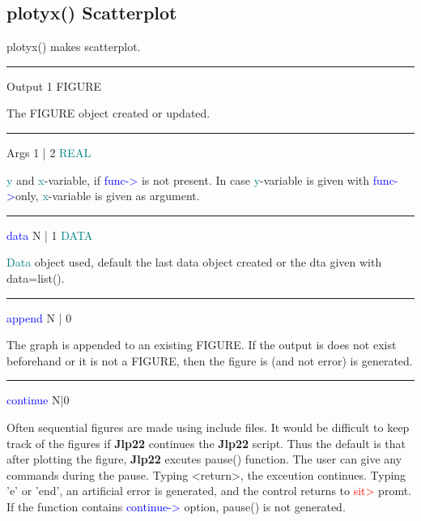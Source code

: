 \subsection{\textcolor{VioletRed}{plotyx}() Scatterplot} 
\label{plotyx} 
\textcolor{VioletRed}{plotyx}() makes scatterplot. 
\vspace{0.3cm} 
\hrule 
\vspace{0.3cm} 
\noindent Output  \tabto{3cm}  1 \tabto{5cm}   FIGURE  \tabto{7cm} 
\begin{changemargin}{3cm}{0cm} 
\noindent  The FIGURE object created or updated. 
\end{changemargin} 
\vspace{0.3cm} 
\hrule 
\vspace{0.3cm} 
\noindent Args  \tabto{3cm}  1 | 2  \tabto{5cm}   \textcolor{teal}{REAL}  \tabto{7cm} 
\begin{changemargin}{3cm}{0cm} 
\noindent  \textcolor{teal}{y} and \textcolor{teal}{x}-variable, if \textcolor{blue}{func->} is not present. 
In case \textcolor{teal}{y}-variable is given with \textcolor{blue}{func->}only,  \textcolor{teal}{x}-variable is given as argument. 
\end{changemargin} 
\vspace{0.3cm} 
\hrule 
\vspace{0.3cm} 
\noindent \textcolor{blue}{data}  \tabto{3cm}  N | 1  \tabto{5cm}   \textcolor{teal}{DATA}  \tabto{7cm} 
\begin{changemargin}{3cm}{0cm} 
\noindent  \textcolor{teal}{Data} object used, default the last data object created or the dta given 
with data=\textcolor{VioletRed}{list}(). 
\end{changemargin} 
\vspace{0.3cm} 
\hrule 
\vspace{0.3cm} 
\noindent \textcolor{blue}{append} \tabto{3cm} N | 0  \tabto{5cm}    \tabto{7cm} 
\begin{changemargin}{3cm}{0cm} 
\noindent  The graph is appended to an existing FIGURE. If the output is does not exist 
beforehand or it is not a FIGURE, then the figure is (and not error) is generated. 
\end{changemargin} 
\vspace{0.3cm} 
\hrule 
\vspace{0.3cm} 
\noindent \textcolor{blue}{continue} \tabto{3cm} N|0  \tabto{5cm}    \tabto{7cm} 
\begin{changemargin}{3cm}{0cm} 
\noindent  Often sequential figures are made using include files. It would be difficult 
to keep track of the figures if \textbf{Jlp22} continues the \textbf{Jlp22} script. Thus the default is that 
after plotting the figure, \textbf{Jlp22} excutes \textcolor{VioletRed}{pause}() function. The user can 
give any commands during the pause. Typing <return>, the exceution continues. Typing 'e' or 'end', 
an artificial error is generated, and the control returns to \textcolor{Red}{sit>} promt. If the function 
contains \textcolor{blue}{continue->} option, \textcolor{VioletRed}{pause}() is not generated. 
\end{changemargin} 
